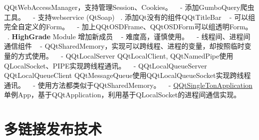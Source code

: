 Q\+Qt\+Web\+Access\+Manager，支持管理\+Session、\+Cookies。 ~\newline
 -\/ 添加\+Gumbo\+Query爬虫工具。 ~\newline
 -\/ 支持webservice (Qt\+Soap) ~. 添加\+Qt没有的组件\+Q\+Qt\+Title\+Bar ~\newline
 -\/ 可以组完全自定义的\+Form。 ~\newline
 -\/ 加上\+Q\+Qt\+O\+S\+D\+Frame、\+Q\+Qt\+O\+S\+D\+Form可以组透明\+Form。 ~. {\bfseries High\+Grade} Module 增加新成员 ~\newline
 -\/ 难度高，谨慎使用。 ~\newline
 -\/ 线程间、进程间通信组件 ~\newline
 -\/ Q\+Qt\+Shared\+Memory，实现可以跨线程、进程的变量，却按照临时变量的方式使用。 ~\newline
 -\/ Q\+Qt\+Local\+Server Q\+Qt\+Local\+Client, Q\+Qt\+Named\+Pipe使用\+Q\+Local\+Socket、\+P\+I\+P\+E实现跨线程通讯。 ~\newline
 -\/ Q\+Qt\+Local\+Queue\+Server Q\+Qt\+Local\+Queue\+Client Q\+Qt\+Message\+Queue使用\+Q\+Qt\+Local\+Queue\+Socket实现跨线程通讯。 ~\newline
 -\/ 使用方法都类似于\+Q\+Qt\+Shared\+Memory。 ~\newline
 -\/ \mbox{\hyperlink{class_q_qt_single_ton_application}{Q\+Qt\+Single\+Ton\+Application}} 单例\+App，基于\+Q\+Qt\+Application，利用基于\+Q\+Local\+Socket的进程间通信实现。 ~\newline
 

 \section*{多链接发布技术}

